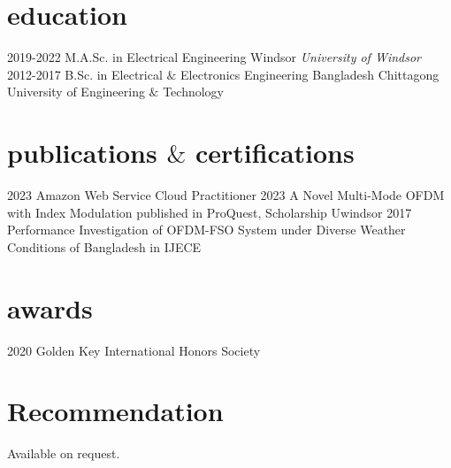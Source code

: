 \documentclass[]{twentysecondcv}
\begin{document}
\section{education}
\begin{twenty}
  \twentyitem
    {2019-2022}
    {M.A.Sc. {\normalfont in Electrical Engineering}}
    {Windsor}
    {\emph{University of Windsor}}
  \twentyitem
    {2012-2017}
    {B.Sc. in Electrical $\&$ Electronics Engineering}
    {Bangladesh}
    {Chittagong University of Engineering $\&$ Technology}
\end{twenty}

\section{publications $\&$ certifications}
\begin{twentyshort}
  \twentyitemshort
    {2023}
    {Amazon Web Service Cloud Practitioner}
  \twentyitemshort
    {2023}
    {A Novel Multi-Mode OFDM with Index Modulation published in ProQuest, Scholarship Uwindsor}
  \twentyitemshort
    {2017}
    {Performance Investigation of OFDM-FSO System under Diverse Weather Conditions of Bangladesh in IJECE}
\end{twentyshort}

\section{awards}
\begin{twentyshort}
  \twentyitemshort
    {2020}
    {Golden Key International Honors Society}
\end{twentyshort}

\section{Recommendation}
Available on request.

\end{document}
